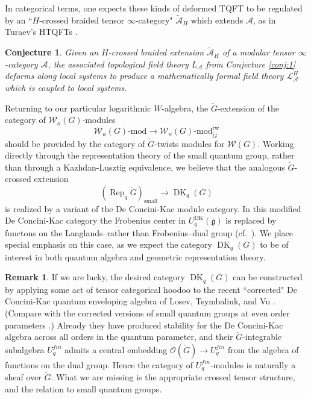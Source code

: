 \documentclass[reqno]{amsart}
\newtheorem{conjecture}[lemma]{Conjecture}
\theoremstyle{definition}
\newtheorem{remark}[lemma]{Remark}
\newcommand{\mfk}[1]{\mathfrak{#1}}
\newcommand{\mcl}[1]{\mathcal{#1}}
\newcommand{\msc}[1]{\mathscr{#1}}
\newcommand{\opn}[1]{\operatorname{#1}}
\DeclareMathOperator{\Rep}{Rep}
\renewcommand{\1}{\mathbf{1}}
\begin{document}
In categorical terms, one expects these kinds of deformed TQFT to be regulated by an ``$H$-crossed braided tensor $\infty$-category" $\tilde{\msc{A}}_H$ which extends $\msc{A}$, as in Turaev's HTQFTs \cite{turaev00}.

\begin{conjecture}\label{conj:6}
Given an $H$-crossed braided extension $\tilde{\msc{A}}_H$ of a modular tensor $\infty$-category $\msc{A}$, the associated topological field theory $L_{\msc{A}}$ from Conjecture \ref{conj:1} deforms along local systems to produce a mathematically formal field theory $\mcl{L}_{\msc{A}}^H$ which is coupled to local systems.
\end{conjecture}

Returning to our particular logarithmic $W$-algebra, the $\check{G}$-extension of the category of $\mcl{W}_{\kappa}(G)$-modules
\[
\mcl{W}_{\kappa}(G)\text{-mod}\to \mcl{W}_{\kappa}(G)\text{-mod}_{\check{G}}^{\opn{tw}}
\]
should be provided by the category of $\check{G}$-twists modules for $\mcl{W}(G)$. Working directly through the representation theory of the small quantum group, rather than through a Kazhdan-Lusztig equivalence, we believe that the analogous $\check{G}$-crossed extension
\[
(\Rep_q\check{G})_{\opn{small}}\to \opn{DK}_q(G)
\]
is realized by a variant of the De Concini-Kac module category. In this modified De Concini-Kac category the Frobenius center in $U^{\opn{DK}}_q(\mfk{g})$ is replaced by functons on the Langlands--rather than Frobenius--dual group (cf.\ \cite{creutzigetal24,losevtsymbaliukvu}). We place special emphasis on this case, as we expect the category $\opn{DK}_q(G)$ to be of interest in both quantum algebra and geometric representation theory.

\begin{remark}
If we are lucky, the desired category $\opn{DK}_q(G)$ can be constructed by applying some act of tensor categorical hoodoo to the recent ``corrected" De Concini-Kac quantum enveloping algebra of Losev, Tsymbaliuk, and Vu \cite{losevtsymbaliukvu}. (Compare with the corrected versions of small quantum groups at even order parameters \cite{creutziggainutdinovrunkel20,negron21,creutzigrupert22,negron26}.) Already they have produced stability for the De Concini-Kac algebra across all orders in the quantum parameter, and their $\check{G}$-integrable subalgebra $U^{fin}_q$ admits a central embedding $\msc{O}(\check{G})\to U^{fin}_q$ from the algebra of functions on the dual group.  Hence the category of $U^{fin}_q$-modules is naturally a sheaf over $\check{G}$. What we are missing is the appropriate crossed tensor structure, and the relation to small quantum groups.
\end{remark}
\end{document}
